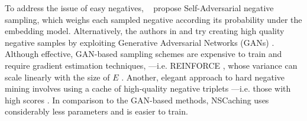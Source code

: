 To address the issue of easy negatives, ~\citet{sun2019rotate} propose Self-Adversarial negative sampling, which weighs each sampled negative according its probability under the embedding model. Alternatively, the authors in \cite{wang2018incorporating} and \cite{cai2017kbgan} try creating high quality negative samples by exploiting Generative Adversarial Networks (GANs) \cite{goodfellow2014generative}. Although effective, GAN-based sampling schemes are expensive to train and require gradient estimation techniques, ---i.e. REINFORCE \cite{williams1992simple} , whose variance can scale linearly with the size of $E$ \cite{cai2017kbgan}. Another, elegant approach to hard negative mining involves using a cache of high-quality negative triplets ---i.e. those with high scores \cite{zhang2019nscaching}. In comparison to the GAN-based methods, NSCaching uses considerably less parameters and is easier to train. 

 




